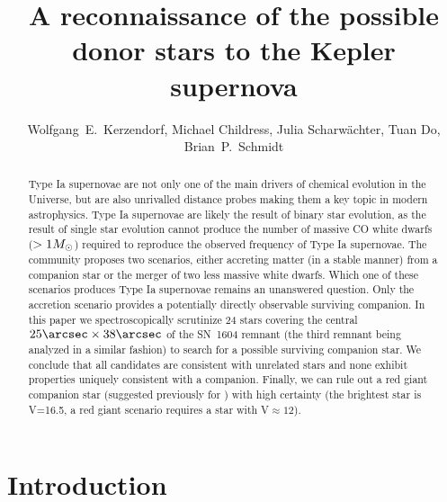 \documentclass[preprint2]{aastex}
\begin{document}
\title{A reconnaissance of the possible donor stars to the Kepler supernova}

\author{Wolfgang~E.~Kerzendorf, Michael Childress, Julia Scharw\"{a}chter, Tuan Do, Brian~P.~Schmidt} 






\begin{abstract}
Type Ia supernovae are not only one of the main drivers of chemical evolution in the Universe, but are also unrivalled distance probes making them a key topic in modern astrophysics. Type Ia supernovae are likely the result of binary star evolution, as the result of single star evolution cannot produce the number of massive CO white dwarfs ($>1\hbox{$M_{\odot}$}$) required to reproduce the observed frequency of Type Ia supernovae.  The community proposes two scenarios, either accreting matter (in a stable manner) from a companion star or the merger of two less massive white dwarfs. Which one of these scenarios produces Type Ia supernovae remains an unanswered question. Only the accretion scenario provides a potentially directly observable surviving companion. 
In this paper we spectroscopically scrutinize 24 stars covering the central $25\arcsec\times38\arcsec$ of the SN~1604 remnant (the third remnant being analyzed in a similar fashion) to search for a possible surviving companion star. We conclude that all candidates are consistent with unrelated stars and none exhibit properties uniquely consistent with a companion. Finally, we can rule out a red giant companion star (suggested previously for ) with high certainty (the brightest star is V=16.5, a red giant scenario requires a star with V$\approx 12$).
\end{abstract}

\maketitle
\section{Introduction}
\end{document}
